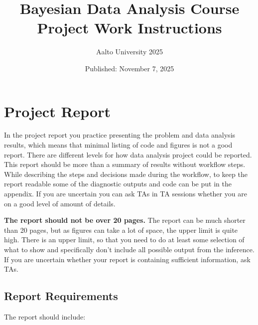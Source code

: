 \documentclass[11pt,a4paper]{article}
\title{Bayesian Data Analysis Course\\Project Work Instructions}
\author{Aalto University 2025}
\date{Published: November 7, 2025}
\begin{document}
\maketitle

\section{Project Report}

In the project report you practice presenting the problem and data analysis results, which means that minimal listing of code and figures is not a good report. There are different levels for how data analysis project could be reported. This report should be more than a summary of results without workflow steps. While describing the steps and decisions made during the workflow, to keep the report readable some of the diagnostic outputs and code can be put in the appendix. If you are uncertain you can ask TAs in TA sessions whether you are on a good level of amount of details.

\textbf{The report should not be over 20 pages.} The report can be much shorter than 20 pages, but as figures can take a lot of space, the upper limit is quite high. There is an upper limit, so that you need to do at least some selection of what to show and specifically don't include all possible output from the inference. If you are uncertain whether your report is containing sufficient information, ask TAs.

\subsection{Report Requirements}

The report should include:
\end{document}
